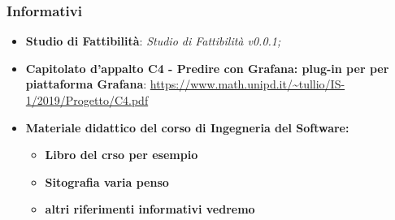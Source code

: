 		\subsubsection{Informativi}
			\begin{itemize}
				\item \textbf{Studio di Fattibilità}: \emph{Studio di Fattibilità v0.0.1;}
				\item \textbf{Capitolato d'appalto C4 - Predire con Grafana: plug-in per per piattaforma Grafana}: \url{https://www.math.unipd.it/~tullio/IS-1/2019/Progetto/C4.pdf}
				\item \textbf{Materiale didattico del corso di Ingegneria del Software:}
				\begin{itemize}
					\item \textbf{Libro del crso per esempio}
					\item \textbf{Sitografia varia penso}
					\item \textbf{altri riferimenti informativi vedremo}
				\end{itemize}
			\end{itemize}				
	